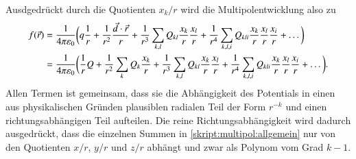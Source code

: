 Ausdgedrückt durch die Quotienten $x_k/r$ wird die Multipolentwicklung
also zu
\begin{align}
f(\vec r)
&=
\frac{1}{4\pi\varepsilon_0}
\biggl(
q
\frac{1}{r}
+
\frac{1}{r^2} \frac{\vec{d}\cdot\vec{r}}{r}
+
\frac{1}{r^3} \sum_{k,l}Q_{kl}\frac{x_k}{r}\frac{x_l}{r}
+
\frac{1}{r^4} \sum_{k,l,i}Q_{kli}\frac{x_k}{r}\frac{x_l}{r}\frac{x_i}{r}
+
\dots
\biggr)
\notag
\\
&=
\frac{1}{4\pi\varepsilon_0}
\biggl(
\frac{1}{r} Q
+
\frac{1}{r^2} \sum_{k}Q_k \frac{x_k}{r}
+
\frac{1}{r^3} \sum_{k,l}Q_{kl}\frac{x_k}{r}\frac{x_l}{r}
+
\frac{1}{r^4} \sum_{k,l,i}Q_{kli}\frac{x_k}{r}\frac{x_l}{r}\frac{x_i}{r}
+
\dots
\biggr).
\label{skript:multipol:allgemein}
\end{align}
Allen Termen ist gemeinsam, dass sie die Abhängigkeit des Potentials in einen
aus physikalischen Gründen plausiblen radialen Teil der Form $r^{-k}$
und einen richtungsabhängigen Teil aufteilen.
Die reine Richtungsabhängigkeit wird dadurch ausgedrückt, dass
die einzelnen Summen in \eqref{skript:multipol:allgemein}
nur von den Quotienten $x/r$, $y/r$ und $z/r$ abhängt und zwar
als Polynom vom Grad $k-1$.



